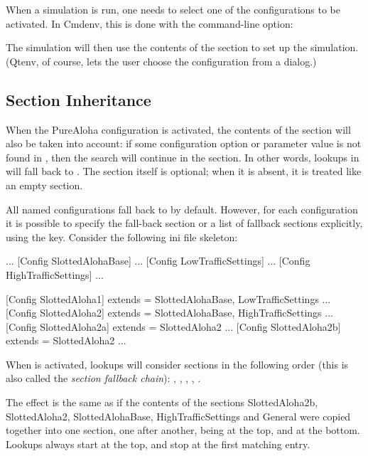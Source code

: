 When a simulation is run, one needs to select one of the configurations
to be activated. In Cmdenv, this is done with the  command-line option:


The simulation will then use the contents of the 
section to set up the simulation. (Qtenv, of course, lets the user choose
the configuration from a dialog.)


\subsection{Section Inheritance}
\label{sec:config-sim:section-inheritance}

When the PureAloha configuration is activated, the contents of
the \ttt{[General]} section will also be taken into account: if some
configuration option or parameter value is not found in ,
then the search will continue in the \ttt{[General]} section. In
other words, lookups in  will fall back to \ttt{[General]}.
The \ttt{[General]} section itself is optional; when it is absent, it is
treated like an empty \ttt{[General]} section.

All named configurations fall back to \ttt{[General]} by default. However, for
each configuration it is possible to specify the fall-back section or a list of
fallback sections explicitly, using the  key. Consider the
following ini file skeleton:

\begin{inifile}
[General]
...
[Config SlottedAlohaBase]
...
[Config LowTrafficSettings]
...
[Config HighTrafficSettings]
...

[Config SlottedAloha1]
extends = SlottedAlohaBase, LowTrafficSettings
...
[Config SlottedAloha2]
extends = SlottedAlohaBase, HighTrafficSettings
...
[Config SlottedAloha2a]
extends = SlottedAloha2
...
[Config SlottedAloha2b]
extends = SlottedAloha2
...
\end{inifile}


When  is activated, lookups will consider sections in the
following order (this is also called the \textit{section fallback chain}):
, , ,
, .

The effect is the same as if the contents of the sections
SlottedAloha2b, SlottedAloha2, SlottedAlohaBase, HighTrafficSettings and
General were copied together into one section, one after another,
 being at the top, and \ttt{[General]}
at the bottom. Lookups always start at the top, and stop at the first
matching entry.

